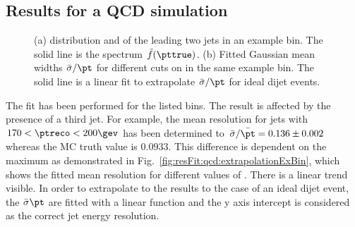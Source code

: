 \documentclass[a4paper]{cmspaper} %
\begin{document}
\subsection{Results for a QCD simulation}
\begin{figure}[ht]
  \begin{center}
     
  \end{center}
  \caption{(a) \ptparticle distribution and of the leading two jets in an example \pt bin.
    The solid line is the spectrum $\tilde{f}(\pttrue)$.
    (b) Fitted Gaussian mean widths $\bar{\sigma}/\pt$ for different cuts on \ptrel in the same example \pt bin.
    The solid line is a linear fit to extrapolate $\bar{\sigma}/\pt$ for ideal dijet events.}
\end{figure}

The fit has been performed for the listed \pt bins.
The result is affected by the presence of a third jet.
For example, the mean resolution for jets with \mbox{$170 < \ptreco < 200\gev$} has been determined to \mbox{$\bar{\sigma}/\bar{\pt} = 0.136 \pm 0.002$} whereas the MC truth value is \mbox{$0.0933$}.
This difference is dependent on the maximum \ptrel as demonstrated in Fig.~\ref{fig:resFit:qcd:extrapolationExBin}, which shows the fitted mean resolution for different values of \ptrel.
There is a linear trend visible.
In order to extrapolate to the results to the case of an ideal dijet event, the $\bar{\sigma}\/\pt$ are fitted with a linear function and the y axis intercept is considered as the correct jet energy resolution.
\end{document}
